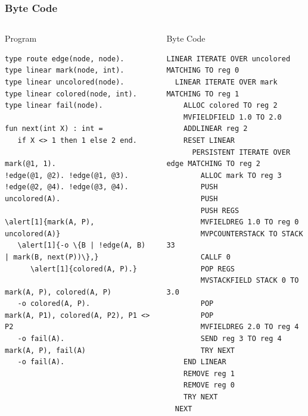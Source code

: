 \documentclass{beamer}
\let\oldalert\alert
\renewcommand{\alert}[2][]{%
  \if\relax\detokenize{#1}\relax%
    \oldalert{#2}%
  \else
    \oldalert<#1>{#2}%
  \fi}
\begin{document}
\begin{frame}[fragile]
   \frametitle{Byte Code}
   \begin{columns}[t]
     \begin{block}{Program}
       \begin{Verbatim}[fontsize=\tiny,commandchars=\\\{\},frame=single]
type route edge(node, node).
type linear mark(node, int).
type linear uncolored(node).
type linear colored(node, int).
type linear fail(node).

fun next(int X) : int =
   if X <> 1 then 1 else 2 end.

mark(@1, 1).
!edge(@1, @2). !edge(@1, @3).
!edge(@2, @4). !edge(@3, @4).
uncolored(A).

\alert[1]{mark(A, P), uncolored(A)}
   \alert[1]{-o \{B | !edge(A, B) | mark(B, next(P))\},}
      \alert[1]{colored(A, P).}

mark(A, P), colored(A, P)
   -o colored(A, P).
mark(A, P1), colored(A, P2), P1 <> P2
   -o fail(A).
mark(A, P), fail(A)
   -o fail(A).
\end{Verbatim}
     \end{block}
   \begin{block}{Byte Code}
\begin{Verbatim}[fontsize=\tiny]
LINEAR ITERATE OVER uncolored MATCHING TO reg 0
  LINEAR ITERATE OVER mark MATCHING TO reg 1
    ALLOC colored TO reg 2
    MVFIELDFIELD 1.0 TO 2.0
    ADDLINEAR reg 2
    RESET LINEAR
      PERSISTENT ITERATE OVER edge MATCHING TO reg 2
        ALLOC mark TO reg 3
        PUSH
        PUSH
        PUSH REGS
        MVFIELDREG 1.0 TO reg 0
        MVPCOUNTERSTACK TO STACK 33
        CALLF 0
        POP REGS
        MVSTACKFIELD STACK 0 TO 3.0
        POP
        POP
        MVFIELDREG 2.0 TO reg 4
        SEND reg 3 TO reg 4
        TRY NEXT
    END LINEAR
    REMOVE reg 1
    REMOVE reg 0
    TRY NEXT
  NEXT
\end{Verbatim}
   \end{block}
   \end{columns}
\end{frame}
\end{document}
